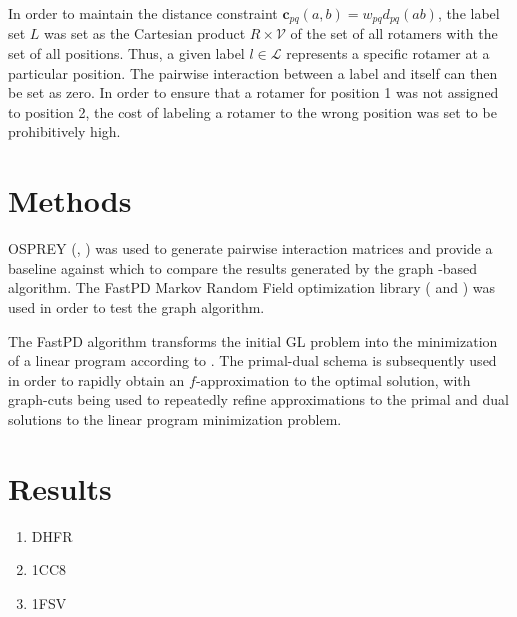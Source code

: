 \documentclass[11pt]{article}
\begin{document}
	In order to maintain the distance constraint 
	$\textbf{c}_{pq}(a,b) =  w_{pq}d_{pq}(ab)$, the label set $L$ was set as the
	Cartesian product $R \times \mathcal{V}$ of the set of all rotamers with the set
	of all positions. Thus, a given label $l \in \mathcal{L}$ represents a specific
	rotamer at a particular position. The pairwise interaction between a label and
	itself can then be set as zero. In order to ensure that a rotamer for position 1
	was not assigned to position 2, the cost of labeling a rotamer to the wrong
	position was set to be prohibitively high. 
	
	\section{Methods}
	
	OSPREY (\cite{OS1}, \cite{OS2}) was used to generate pairwise interaction matrices
	and provide a baseline against which to compare the results generated by the graph
	-based algorithm. The FastPD Markov Random Field optimization library 
	(\cite{Karmarkar} and \cite{Komodakis}) was used in order to test the graph
	algorithm. 
	
	The FastPD algorithm transforms the initial GL problem into the minimization
	of a linear program according to \cite{CKNZ}. The primal-dual schema is
	subsequently used in order to rapidly obtain an $f$-approximation to the 
	optimal solution, with graph-cuts being used to repeatedly refine approximations
	to the primal and dual solutions to the linear program minimization problem. 
	
	\section{Results}
	
	\begin{enumerate}
		\item DHFR
		\item 1CC8
		\item 1FSV
	\end{enumerate}
\end{document}
